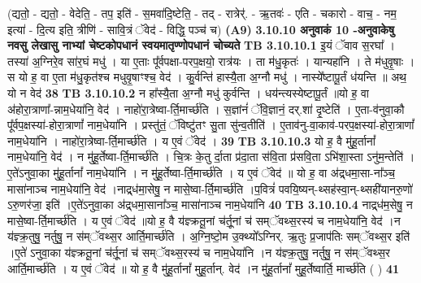 \documentclass[17pt]{extarticle}
\begin{document}
{{{{{{{{{{{{{{{{{{{{{{                                (द्यतो॒ - द्यतो॒ - वेदेति॒ - तप॒ इति॑ - स॒मवा॑दि॒ष्टेति॒ - तद् - रात्रेर्॑. - ऋ॒तवः॑ - एति - चकारो - वाच॒ - नम॒ इत्या॑ - दि॒त्य इति॒ त्रीणि॑ - सावि॒त्रं ॅवेद॑ - विद्धि॒ पञ्च॑ च) \textbf{(A9)} \newline \newline
                \textbf{ 3.10.10   अनुवाकं   10 -अनुवाकेषु नवसु लेखासु नाभ्यां चेष्टकोपधानं स्वयमातृण्णोपधानं चोच्यते} \newline
                                \textbf{ TB 3.10.10.1} \newline
                  इ॒यं ॅवाव स॒रघा᳚ । तस्या॑ अ॒ग्निरे॒व सा॑र॒घं मधु॑ । या ए॒ताः पू᳚र्वपक्षा-परप॒क्षयो॒ रात्र॑यः । ता म॑धु॒कृतः॑ । यान्यहा॑नि । ते म॑धुवृ॒षाः ।स यो ह॒ वा ए॒ता म॑धु॒कृत॑श्च मधुवृ॒षाꣳश्च॒ वेद॑ । कु॒र्वन्ति॑ हास्यै॒ता अ॒ग्नौ मधु॑ । नास्ये᳚ष्टापू॒र्तं ध॑यन्ति ॥ अथ॒ यो न वेद॑ \textbf{ 38} \newline
                  \newline
                                \textbf{ TB 3.10.10.2} \newline
                  न हा᳚स्यै॒ता अ॒ग्नौ मधु॑ कुर्वन्ति । धय॑न्त्यस्येष्टापू॒र्तं ॥यो ह॒ वा अ॑होरा॒त्राणा᳚-न्नाम॒धेया॑नि॒ वेद॑ । नाहो॑रा॒त्रेष्वा-र्ति॒मार्च्छ॑ति । स॒ज्ञांनं॑ ॅवि॒ज्ञानं॒ दर्.शा॑ दृ॒ष्टेति॑ । ए॒ता-व॑नुवा॒कौ पू᳚र्वप॒क्षस्या॑-होरा॒त्राणां᳚ नाम॒धेया॑नि । प्रस्तु॑तं॒ ॅविष्टु॑तꣳ सु॒ता सु॑न्व॒तीति॑ । ए॒ताव॑नु-वा॒काव॑-परप॒क्षस्या॑-होरा॒त्राणां᳚ नाम॒धेया॑नि । नाहो॑रा॒त्रेष्वा-र्ति॒मार्च्छ॑ति । य ए॒वं ॅवेद॑ । \textbf{ 39} \newline
                  \newline
                                \textbf{ TB 3.10.10.3} \newline
                  यो ह॒ वै मु॑हू॒र्तानां᳚ नाम॒धेया॑नि॒ वेद॑ । न मु॑हू॒र्तेष्वा-र्ति॒मार्च्छ॑ति । चि॒त्रः के॒तु र्दा॒ता प्र॑दा॒ता स॑वि॒ता प्र॑सवि॒ता ऽभि॑शा॒स्ता ऽनु॑म॒न्तेति॑ । ए॒ते॑ऽनुवा॒का मु॑हू॒र्तानां᳚ नाम॒धेया॑नि । न मु॑हू॒र्तेष्वा-र्ति॒मार्च्छ॑ति । य ए॒वं ॅवेद॑ ॥ यो ह॒ वा अ॑द्र्धमा॒सा-ना᳚ञ्च॒ मासा॑नाञ्च नाम॒धेया॑नि॒ वेद॑ ।नाद्र्ध॑मा॒सेषु॒ न मासे॒ष्वा-र्ति॒मार्च्छ॑ति ।प॒वित्रं॑ पवयि॒ष्यन्-थ्सह॑स्वा॒न्-थ्सही॑यानरु॒णो॑ ऽरु॒णर॑जा॒ इति॑ ।ए॒ते॑ऽनुवा॒का अ॑द्र्धमा॒साना᳚ञ्च॒ मासा॑नाञ्च नाम॒धेया॑नि \textbf{ 40} \newline
                  \newline
                                \textbf{ TB 3.10.10.4} \newline
                  नाद्र्ध॑म॒सेषु॒ न मासे॒ष्वा-र्ति॒मार्च्छ॑ति । य ए॒वं ॅवेद॑ ॥यो ह॒ वै य॑ज्ञ्क्रतू॒नां च॑र्तू॒नां च॑ सम्ॅवथ्स॒रस्य॑ च नाम॒धेया॑नि॒ वेद॑ ।न य॑ज्ञ्क्र॒तुषु॒ नर्तुषु॒ न स॑म्ॅवथ्स॒र आर्ति॒मार्च्छ॑ति । अ॒ग्नि॒ष्टो॒म उ॒क्थ्यो᳚ऽग्निर्. ऋ॒तुः प्र॒जाप॑तिः सम्ॅवथ्स॒र इति॑ ।ए॒ते॑ ऽनुवा॒का य॑ज्ञ्क्रतू॒नां च॑र्तू॒नां च॑ सम्ॅवथ्स॒रस्य॑ च नाम॒धेया॑नि ।न य॑ज्ञ्क्र॒तुषु॒ नर्तुषु॒ न स॑म्ॅवथ्स॒र आर्ति॒मार्च्छ॑ति । य ए॒वं ॅवेद॑ ॥ यो ह॒ वै मु॑हू॒र्तानां᳚ मुहू॒र्तान्. वेद॑ ।न मु॑हू॒र्तानां᳚ मुहू॒र्तेष्वार्ति॒ मार्च्छ॑ति ( ) \textbf{ 41} \newline
}}}}}}}}}}}}}}}}}}}}}}
\end{document}
